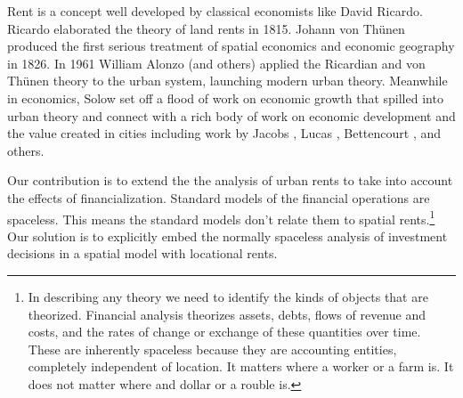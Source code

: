 Rent is a concept well developed by classical economists like David Ricardo. %
Ricardo \cite{ricardoEssayInfluenceLow1815} elaborated the theory of land rents in 1815. Johann von Th\"unen \cite{vonthunenIsolirteStaatBeziehung1826} %
produced the first serious treatment of spatial economics and economic geography %
in 1826. In 1961 William Alonzo (and others) \cite{alonsoModelUrbanLand1960} applied the  Ricardian and von Th\"unen theory to the urban system, launching modern urban theory. Meanwhile in economics, Solow \cite{solowContributionTheoryEconomic1956} set off a flood of work on economic growth that spilled into urban theory and connect with a rich body of work on economic development and the value created in cities including work by Jacobs \cite{jacobsEconomyCities1969}, Lucas \cite{lucasMechanicsEconomicDevelopment1988}, Bettencourt  \cite{bettencourtGrowthInnovationScaling2007}, and others. 

Our contribution is to extend the the analysis of urban rents to take into account the effects of financialization. 
Standard models of the financial operations are spaceless. This means the standard models don't relate them to spatial rents.\footnote{In describing any theory we need to identify the kinds of objects that are theorized. Financial analysis theorizes  assets, debts, flows of revenue and costs, and the rates of change or exchange of these quantities over time. These are inherently spaceless because they are accounting entities, completely independent of location. It matters where a worker or a farm is. It does not matter where and dollar or a rouble is.} 
Our solution is to explicitly embed the normally spaceless analysis of investment decisions in a spatial model with locational rents. %

